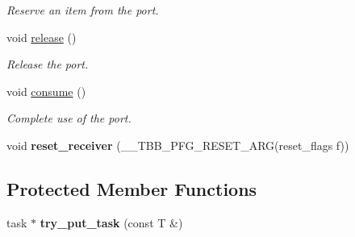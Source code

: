 \begin{DoxyCompactItemize}
\begin{DoxyCompactList}\small\item\em Reserve an item from the port. \end{DoxyCompactList}\item 
\hypertarget{classinternal_1_1reserving__port_a1512cd5ccce5a48237f6b7863c2e4d7b}{}void \hyperlink{classinternal_1_1reserving__port_a1512cd5ccce5a48237f6b7863c2e4d7b}{release} ()\label{classinternal_1_1reserving__port_a1512cd5ccce5a48237f6b7863c2e4d7b}

\begin{DoxyCompactList}\small\item\em Release the port. \end{DoxyCompactList}\item 
\hypertarget{classinternal_1_1reserving__port_acb41c2ff4d38eb3208d07008f0112bd3}{}void \hyperlink{classinternal_1_1reserving__port_acb41c2ff4d38eb3208d07008f0112bd3}{consume} ()\label{classinternal_1_1reserving__port_acb41c2ff4d38eb3208d07008f0112bd3}

\begin{DoxyCompactList}\small\item\em Complete use of the port. \end{DoxyCompactList}\item 
\hypertarget{classinternal_1_1reserving__port_aad916952dfcc5b392fa378aff85d862c}{}void {\bfseries reset\+\_\+receiver} (\+\_\+\+\_\+\+T\+B\+B\+\_\+\+P\+F\+G\+\_\+\+R\+E\+S\+E\+T\+\_\+\+A\+R\+G(reset\+\_\+flags f))\label{classinternal_1_1reserving__port_aad916952dfcc5b392fa378aff85d862c}

\end{DoxyCompactItemize}
\subsection*{Protected Member Functions}
\begin{DoxyCompactItemize}
\item 
\hypertarget{classinternal_1_1reserving__port_ac6032b4ae1640aca50ad3720fd24ca1d}{}task $\ast$ {\bfseries try\+\_\+put\+\_\+task} (const T \&)\label{classinternal_1_1reserving__port_ac6032b4ae1640aca50ad3720fd24ca1d}

\end{DoxyCompactItemize}
